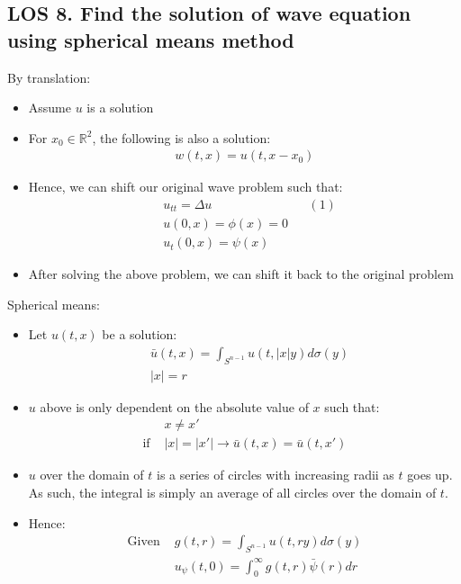 \documentclass[12pt, a4paper]{article}
\begin{document}
\subsection*{LOS 8. Find the solution of wave equation using spherical means method}
By translation:
\begin{itemize}
    \item Assume $u$ is a solution
    \item For $x_0 \in \mathbb{R}^2$, the following is also a solution:
    \begin{align*}
        w(t, x) = u(t, x-x_0)
    \end{align*}
    \item Hence, we can shift our original wave problem such that:
    \begin{align*}
        &u_{tt} = \Delta u && (1)\\
        &u(0, x) = \phi(x) = 0\\
        &u_t(0, x) = \psi(x)
    \end{align*}
    \item After solving the above problem, we can shift it back to the original problem\\
\end{itemize}
Spherical means:
\begin{itemize}
    \item Let $u(t, x)$ be a solution:
    \begin{align*}
        &\bar{u}(t, x) = \int_{S^{n-1}}u(t, |x|y)d\sigma(y)\\
        &|x| = r
    \end{align*}
    \item $u$ above is only dependent on the absolute value of $x$ such that:
    \begin{align*}
        &x \ne x'\\
        \text{if }&|x| = |x'| \rightarrow \bar{u}(t, x) = \bar{u}(t, x')
    \end{align*}
    \item $u$ over the domain of $t$ is a series of circles with increasing radii as $t$ goes up. As such, the integral is simply an average of all circles over the domain of $t$.
    \item Hence:
    \begin{align*}
        \text{Given }&g(t, r) = \int_{S^{n-1}}u(t, ry)d\sigma(y)\\
        &u_\psi(t, 0) = \int_0^\infty g(t, r)\bar{\psi}(r)dr
    \end{align*} 
\end{itemize}
\end{document}
